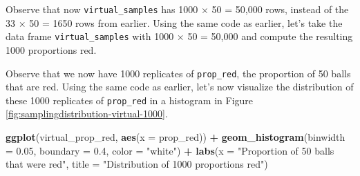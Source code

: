 \documentclass[12pt, krantz2,]{krantz}
\makeatletter
\newenvironment{Shaded}{\begin{snugshade}}{\end{snugshade}}
\newcommand{\DataTypeTok}[1]{\textcolor[rgb]{0.27,0.27,0.27}{#1}}
\newcommand{\DecValTok}[1]{\textcolor[rgb]{0.06,0.06,0.06}{#1}}
\newcommand{\FloatTok}[1]{\textcolor[rgb]{0.06,0.06,0.06}{#1}}
\newcommand{\KeywordTok}[1]{\textcolor[rgb]{0.27,0.27,0.27}{\textbf{#1}}}
\newcommand{\NormalTok}[1]{#1}
\newcommand{\OperatorTok}[1]{\textcolor[rgb]{0.43,0.43,0.43}{\textbf{#1}}}
\newcommand{\StringTok}[1]{\textcolor[rgb]{0.5,0.5,0.5}{#1}}
\newenvironment{kframe}{%
\medskip{}
\setlength{\fboxsep}{.8em}
 \def\at@end@of@kframe{}%
 \ifinner\ifhmode%
  \def\at@end@of@kframe{\end{minipage}}%
  \begin{minipage}{\columnwidth}%
 \fi\fi%
 \def\FrameCommand##1{\hskip\@totalleftmargin \hskip-\fboxsep
 \colorbox{shadecolor}{##1}\hskip-\fboxsep
     \hskip-\linewidth \hskip-\@totalleftmargin \hskip\columnwidth}%
 \MakeFramed {\advance\hsize-\width
   \@totalleftmargin\z@ \linewidth\hsize
   \@setminipage}}%
 {\par\unskip\endMakeFramed%
 \at@end@of@kframe}
\renewenvironment{Shaded}{\begin{kframe}}{\end{kframe}}
\makeatother
\begin{document}
\begin{Shaded}
\end{Shaded}

Observe that now \texttt{virtual\_samples} has 1000 \(\times\) 50 = 50,000 rows, instead of the 33 \(\times\) 50 = 1650 rows from earlier. Using the same code as earlier, let's take the data frame \texttt{virtual\_samples} with 1000 \(\times\) 50 = 50,000 and compute the resulting 1000 proportions red.

\begin{Shaded}
\end{Shaded}

Observe that we now have 1000 replicates of \texttt{prop\_red}, the proportion of 50 balls that are red. Using the same code as earlier, let's now visualize the distribution of these 1000 replicates of \texttt{prop\_red} in a histogram in Figure \ref{fig:samplingdistribution-virtual-1000}.

\begin{Shaded}
\begin{Highlighting}[]
\KeywordTok{ggplot}\NormalTok{(virtual_prop_red, }\KeywordTok{aes}\NormalTok{(}\DataTypeTok{x =}\NormalTok{ prop_red)) }\OperatorTok{+}
\StringTok{  }\KeywordTok{geom_histogram}\NormalTok{(}\DataTypeTok{binwidth =} \FloatTok{0.05}\NormalTok{, }\DataTypeTok{boundary =} \FloatTok{0.4}\NormalTok{, }\DataTypeTok{color =} \StringTok{"white"}\NormalTok{) }\OperatorTok{+}
\StringTok{  }\KeywordTok{labs}\NormalTok{(}\DataTypeTok{x =} \StringTok{"Proportion of 50 balls that were red"}\NormalTok{, }
       \DataTypeTok{title =} \StringTok{"Distribution of 1000 proportions red"}\NormalTok{) }
\end{Highlighting}
\end{Shaded}
\end{document}
